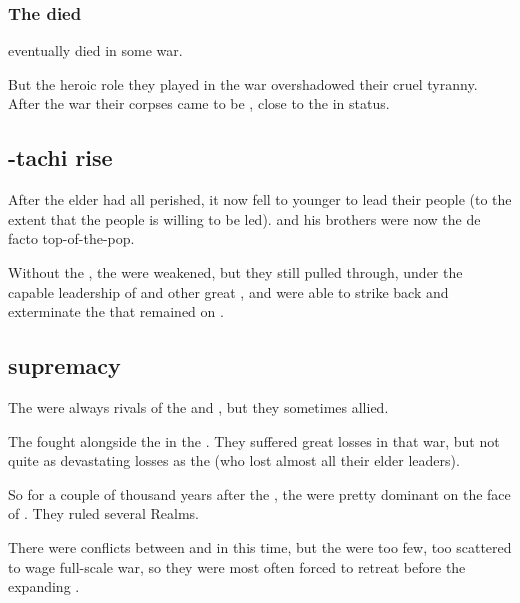 \subsubsection{The \firstgendragons{} died}
\Tiamat{} eventually died in some war. 

But the heroic role they played in the war overshadowed their cruel tyranny. 
After the war their corpses came to be , close to the \xss{} in status. 










\subsection{\Nexagglachel-tachi rise}
After the elder \dragons{} had all perished, it now fell to younger \dragons{} to lead their people (to the extent that the \draconic{} people is willing to be led). 
\Nexagglachel{} and his brothers were now the de facto top-of-the-pop. 

Without the \firstgendragons, the \dragons{} were weakened, but they still pulled through, under the capable leadership of \Nexagglachel{} and other great \dragonlords, and were able to strike back and exterminate the \banes{} that remained on \Miith. 









\subsection{\QuilJaaran{} supremacy}
The \quiljaaran{} were always rivals of the \dragons{} and \ophidians, but they sometimes allied. 

The \quiljaaran{} fought alongside the \dragons{} in the \firstbanewar. 
They suffered great losses in that war, but not quite as devastating losses as the \dragons{} (who lost almost all their elder leaders). 

So for a couple of thousand years after the \firstbanewar, the \quiljaaran{} were pretty dominant on the face of \Miith{}. 
They ruled several Realms. 

There were conflicts between \quiljaaran{} and \dragons{} in this time, but the \dragons{} were too few, too scattered to wage full-scale war, so they were most often forced to retreat before the expanding \quiljaaran. 

